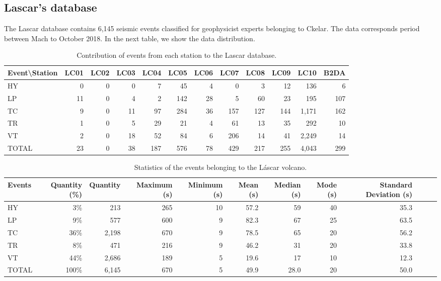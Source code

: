 \documentclass[journal]{IEEEtran}
\begin{document}
\subsection{Lascar's database}
The Lascar database contains 6,145 seismic events classified for geophysicist experts belonging to Ckelar. The data corresponds period between Mach to October 2018. In the next table, we show the data distribution.
\begin{table}
\caption{Contribution of events from each station to the Lascar database.} %
\centering
\begin{adjustbox}{width=\textwidth}
\begin{tabular}{lrrrrrrrrrrr}
\hline\hline %
Event\textbackslash{}Station & LC01 & LC02 & LC03 & LC04 & LC05 & LC06 & LC07 & LC08 & LC09 & LC10 & B2DA \\
\hline %
HY & 0 & 0 & 0 & 7 & 45 & 4 & 0 & 3 & 12 & 136 & 6 \\
LP & 11 & 0 & 4 & 2 & 142 & 28 & 5 & 60 & 23 & 195 & 107 \\
TC & 9 & 0 & 11 & 97 & 284 & 36 & 157 & 127 & 144 & 1,171 & 162 \\
TR & 1 & 0 & 5 & 29 & 21 & 4 & 61 & 13 & 35 & 292 & 10 \\
VT & 2 & 0 & 18 & 52 & 84 & 6 & 206 & 14 & 41 & 2,249 & 14 \\
TOTAL & 23 & 0 & 38 & 187 & 576 & 78 & 429 & 217 & 255 & 4,043 & 299 \\
\hline %
\end{tabular}
\end{adjustbox}
\label{table:lascar_database}
\end{table}

\begin{table}
\caption{Statistics of the events belonging to the Láscar volcano.} %
\centering
\begin{tabular}{lrrrrrrrrrrr}
\hline\hline %
  Events & Quantity (\%) & Quantity & Maximum (s) & Minimum (s) & Mean (s) & Median (s) & Mode (s) & Standard Deviation (s)  \\
\hline %
HY & 3\% & 213 & 265 & 10 & 57.2 & 59 & 40 & 35.3 \\
LP & 9\% & 577 & 600 & 9 & 82.3 & 67 & 25 & 63.5 \\
TC & 36\% & 2,198 & 670 & 9 & 78.5 & 65 & 20 & 56.2 \\
TR & 8\% & 471 & 216 & 9 & 46.2 & 31 & 20 & 33.8 \\
VT & 44\% & 2,686 & 189 & 5 & 19.6 & 17 & 10 & 12.3 \\
TOTAL & 100\% & 6,145 & 670 & 5 & 49.9 & 28.0 & 20 & 50.0 \\
\hline %
\end{tabular}
\label{table:lascar_statistics}
\end{table}
\end{document}
